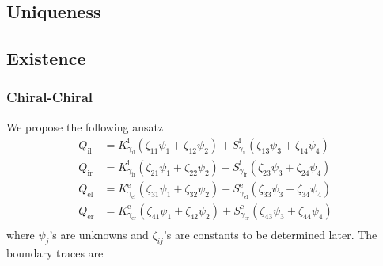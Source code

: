 \subsection{Uniqueness}


\subsection{Existence} 


\subsubsection{Chiral-Chiral}

We propose the following ansatz 
\begin{align*}
  Q_\text{il} &= K_{\gamma_\text{il}}^{\text{i}} (\zeta_{11}\psi_1 + \zeta_{12}\psi_2) + S_{\gamma_\text{il}}^{\text{i}} (\zeta_{13} \psi_3 + \zeta_{14}\psi_4) \\
  Q_\text{ir} &= K_{\gamma_\text{ir}}^{\text{i}} (\zeta_{21}\psi_1 + \zeta_{22}\psi_2) + S_{\gamma_\text{ir}}^{\text{i}} (\zeta_{23} \psi_3 + \zeta_{24}\psi_4) \\
  Q_\text{el} &= K_{\gamma_\text{el}}^{\text{e}} (\zeta_{31}\psi_1 + \zeta_{32}\psi_2) + S_{\gamma_\text{el}}^{\text{e}} (\zeta_{33} \psi_3 + \zeta_{34}\psi_4) \\
  Q_\text{er} &= K_{\gamma_\text{er}}^{\text{e}} (\zeta_{41}\psi_1 + \zeta_{42}\psi_2) + S_{\gamma_\text{er}}^{\text{e}} (\zeta_{43} \psi_3 + \zeta_{44}\psi_4) \\
\end{align*}
where $\psi_j$'s are unknowns and $\zeta_{ij}$'s are constants to be determined later. The boundary traces are 
